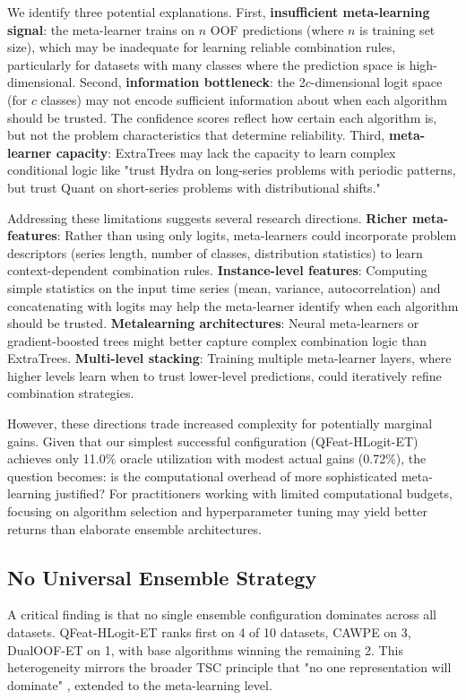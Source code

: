 \documentclass[pdflatex,sn-basic]{sn-jnl}           %
\theoremstyle{thmstyleone}%
\theoremstyle{thmstyletwo}%
\theoremstyle{thmstylethree}%
\begin{document}
We identify three potential explanations. First, \textbf{insufficient meta-learning signal}: the meta-learner trains on $n$ OOF predictions (where $n$ is training set size), which may be inadequate for learning reliable combination rules, particularly for datasets with many classes where the prediction space is high-dimensional. Second, \textbf{information bottleneck}: the 2$c$-dimensional logit space (for $c$ classes) may not encode sufficient information about when each algorithm should be trusted. The confidence scores reflect how certain each algorithm is, but not the problem characteristics that determine reliability. Third, \textbf{meta-learner capacity}: ExtraTrees may lack the capacity to learn complex conditional logic like "trust Hydra on long-series problems with periodic patterns, but trust Quant on short-series problems with distributional shifts."

Addressing these limitations suggests several research directions. \textbf{Richer meta-features}: Rather than using only logits, meta-learners could incorporate problem descriptors (series length, number of classes, distribution statistics) to learn context-dependent combination rules. \textbf{Instance-level features}: Computing simple statistics on the input time series (mean, variance, autocorrelation) and concatenating with logits may help the meta-learner identify when each algorithm should be trusted. \textbf{Metalearning architectures}: Neural meta-learners or gradient-boosted trees might better capture complex combination logic than ExtraTrees. \textbf{Multi-level stacking}: Training multiple meta-learner layers, where higher levels learn when to trust lower-level predictions, could iteratively refine combination strategies.

However, these directions trade increased complexity for potentially marginal gains. Given that our simplest successful configuration (QFeat-HLogit-ET) achieves only 11.0\% oracle utilization with modest actual gains (0.72\%), the question becomes: is the computational overhead of more sophisticated meta-learning justified? For practitioners working with limited computational budgets, focusing on algorithm selection and hyperparameter tuning may yield better returns than elaborate ensemble architectures.

\subsection{No Universal Ensemble Strategy}

A critical finding is that no single ensemble configuration dominates across all datasets. QFeat-HLogit-ET ranks first on 4 of 10 datasets, CAWPE on 3, DualOOF-ET on 1, with base algorithms winning the remaining 2. This heterogeneity mirrors the broader TSC principle that "no one representation will dominate" \citep{tsc-bakeoff}, extended to the meta-learning level.
\end{document}
